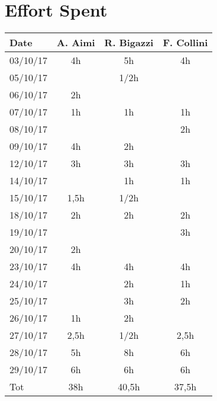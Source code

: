 %
%
\chapter{Effort Spent}
%
\label{cap:effortspent}
%

\begin{center}
\def\arraystretch{1.25}
  \begin{tabular}{ | l | c | c | c |}
    \hline
    Date & A. Aimi & R. Bigazzi & F. Collini \\ \hline
    03/10/17 & 4h & 5h & 4h \\
    05/10/17 & & 1/2h& \\
    06/10/17 & 2h & & \\
    07/10/17 & 1h & 1h & 1h\\
    08/10/17 & & & 2h\\
    09/10/17 & 4h & 2h & \\
    12/10/17 & 3h & 3h & 3h \\
    14/10/17 & & 1h & 1h \\
    15/10/17 & 1,5h & 1/2h & \\
    18/10/17 & 2h & 2h & 2h \\
    19/10/17 & & & 3h\\
    20/10/17 & 2h & & \\
    23/10/17 & 4h & 4h & 4h \\
    24/10/17 & & 2h & 1h \\
    25/10/17 & & 3h & 2h\\
    26/10/17 & 1h & 2h & \\
    27/10/17 & 2,5h & 1/2h & 2,5h\\
    28/10/17 & 5h & 8h & 6h \\
    29/10/17 & 6h & 6h & 6h \\ \hline
    Tot & 38h & 40,5h & 37,5h \\ \hline
  \end{tabular}
\end{center}
%
